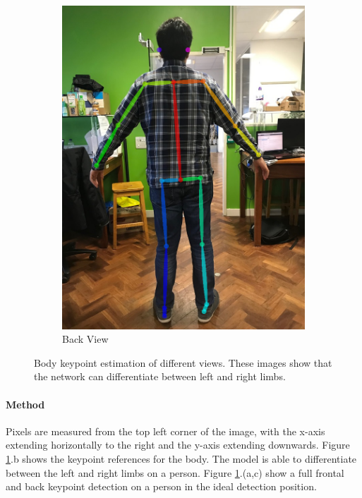 \begin{figure}[ht]
\begin{subfigure}[b]{.32\textwidth}
		\includegraphics[width=1.0\linewidth]{img/chapter5_implementation/shreyBack.png}
		\caption{Back View}
	\end{subfigure}
	\vspace{-1\baselineskip}
	\begin{center}
		\caption{Body keypoint estimation of different views. These images show that the network can differentiate between left and right limbs.}
		\label{fig:keypointShrey}
	\end{center}
	\vspace{-2\baselineskip}
\end{figure}

\paragraph{Method} Pixels are measured from the top left corner of the image, with the x-axis extending horizontally to the right and the y-axis extending downwards. Figure \ref{fig:keypointShrey}.b shows the keypoint references for the body. The model is able to differentiate between the left and right limbs on a person. Figure \ref{fig:keypointShrey}.(a,c) show a full frontal and back keypoint detection on a person in the ideal detection position. 

